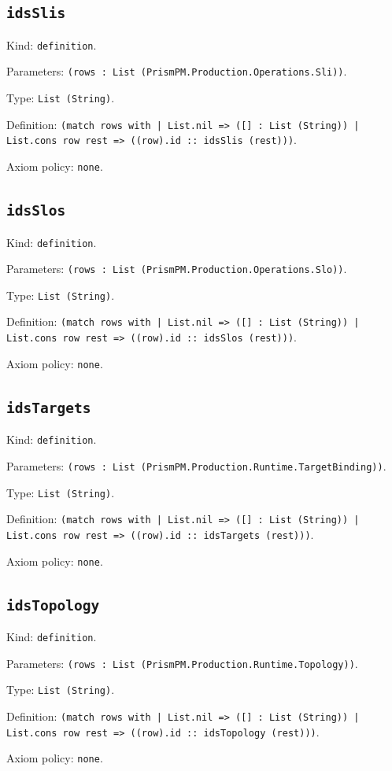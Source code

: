 \documentclass[11pt]{article}
\begin{document}
\subsection*{\texttt{idsSlis}}
\noindent Kind: \texttt{definition}.\par
\noindent Parameters: \texttt{(rows : List (PrismPM.Production.Operations.Sli))}.\par
\noindent Type: \texttt{List (String)}.\par
\noindent Definition: \texttt{(match rows with | List.nil => ([] : List (String)) | List.cons row rest => ((row).id :: idsSlis (rest)))}.\par
\noindent Axiom policy: \texttt{none}.\par
\subsection*{\texttt{idsSlos}}
\noindent Kind: \texttt{definition}.\par
\noindent Parameters: \texttt{(rows : List (PrismPM.Production.Operations.Slo))}.\par
\noindent Type: \texttt{List (String)}.\par
\noindent Definition: \texttt{(match rows with | List.nil => ([] : List (String)) | List.cons row rest => ((row).id :: idsSlos (rest)))}.\par
\noindent Axiom policy: \texttt{none}.\par
\subsection*{\texttt{idsTargets}}
\noindent Kind: \texttt{definition}.\par
\noindent Parameters: \texttt{(rows : List (PrismPM.Production.Runtime.TargetBinding))}.\par
\noindent Type: \texttt{List (String)}.\par
\noindent Definition: \texttt{(match rows with | List.nil => ([] : List (String)) | List.cons row rest => ((row).id :: idsTargets (rest)))}.\par
\noindent Axiom policy: \texttt{none}.\par
\subsection*{\texttt{idsTopology}}
\noindent Kind: \texttt{definition}.\par
\noindent Parameters: \texttt{(rows : List (PrismPM.Production.Runtime.Topology))}.\par
\noindent Type: \texttt{List (String)}.\par
\noindent Definition: \texttt{(match rows with | List.nil => ([] : List (String)) | List.cons row rest => ((row).id :: idsTopology (rest)))}.\par
\noindent Axiom policy: \texttt{none}.\par
\end{document}
